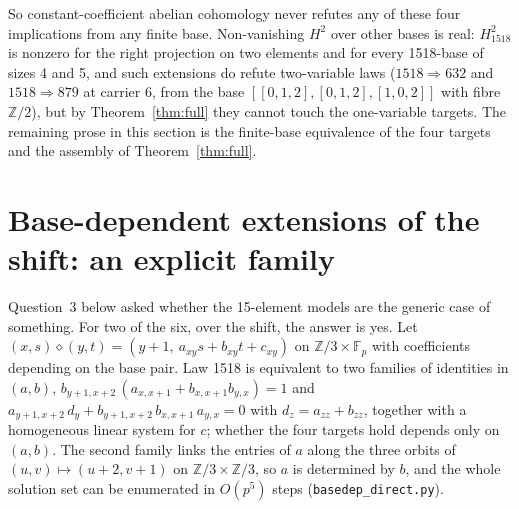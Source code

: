 \documentclass[11pt]{article}
\theoremstyle{remark}\newtheorem*{remark}{Remark}
\newcommand{\op}{\diamond}
\newcommand{\Z}{\mathbb{Z}}
\newcommand{\F}{\mathbb{F}}
\begin{document}
So constant-coefficient abelian cohomology never refutes any of these four implications from any finite base. Non-vanishing $H^{2}$ over other bases is real: $H^{2}_{1518}$ is nonzero for the right projection on two elements and for every 1518-base of sizes 4 and 5, and such extensions do refute two-variable laws ($1518\Rightarrow 632$ and $1518\Rightarrow 879$ at carrier 6, from the base $[[0,1,2],[0,1,2],[1,0,2]]$ with fibre $\Z/2$), but by Theorem~\ref{thm:full} they cannot touch the one-variable targets. The remaining prose in this section is the finite-base equivalence of the four targets and the assembly of Theorem~\ref{thm:full}.

\section{Base-dependent extensions of the shift: an explicit family}\label{sec:family}

Question~3 below asked whether the 15-element models are the generic case of something. For two of the six, over the shift, the answer is yes. Let $(x,s)\op(y,t)=(y+1,\ a_{xy}s+b_{xy}t+c_{xy})$ on $\Z/3\times\F_p$ with coefficients depending on the base pair. Law 1518 is equivalent to two families of identities in $(a,b)$, $b_{y+1,x+2}\,(a_{x,x+1}+b_{x,x+1}b_{y,x})=1$ and $a_{y+1,x+2}\,d_y+b_{y+1,x+2}\,b_{x,x+1}\,a_{y,x}=0$ with $d_z=a_{zz}+b_{zz}$, together with a homogeneous linear system for $c$; whether the four targets hold depends only on $(a,b)$. The second family links the entries of $a$ along the three orbits of $(u,v)\mapsto(u+2,v+1)$ on $\Z/3\times\Z/3$, so $a$ is determined by $b$, and the whole solution set can be enumerated in $O(p^{5})$ steps (\texttt{basedep\_direct.py}).
\end{document}
